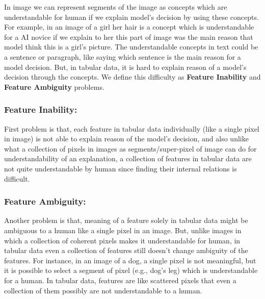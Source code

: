 \documentclass{llncs}
\begin{document}
In image we can represent segments of the image as concepts \cite{ghorbani2019towards} which are understandable for human if we explain model's decision by using these concepts. For example, in an image of a girl her hair is a concept which is understandable for a AI novice if we explain to her this part of image was the main reason that model think this is a girl's picture. The understandable concepts in text could be a sentence or paragraph, like saying which sentence is the main reason for a model decision.
But, in tabular data, it is hard to explain reason of a model’s decision through the concepts. We define this difficulty as \textbf{Feature Inability} and \textbf{Feature Ambiguity} problems.

\subsubsection*{Feature Inability:}First problem is that, each feature in tabular data individually (like a single pixel in image) is not able to explain reason of the model’s decision, and also unlike what a collection of pixels in images as segments/super-pixel of image can do for understandability of an explanation, a collection of features in tabular data are not quite understandable by human since finding their internal relations is difficult.

\subsubsection*{Feature Ambiguity:}Another problem is that, meaning of a feature solely in tabular data might be ambiguous to a human like a single pixel in an image. But, unlike images in which a collection of coherent pixels makes it understandable for human, in tabular data even a collection of features still doesn't change ambiguity of the features. For instance, in an image of a dog, a single pixel is not meaningful, but it is possible to select a segment of pixel (e.g., dog’s leg) which is understandable for a human. In tabular data, features are like scattered pixels that even a collection of them possibly are not understandable to a human. 
\end{document}
